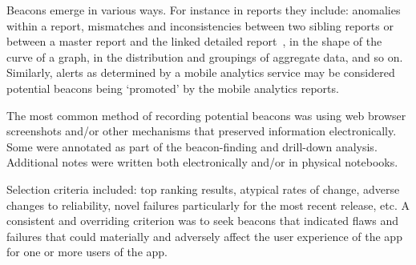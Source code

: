 
Beacons emerge in various ways. For instance in reports they include: anomalies within a report, mismatches and inconsistencies between two sibling reports or between a master report and the linked detailed report~, in the shape of the curve of a graph, in the distribution and groupings of aggregate data, and so on. Similarly, alerts as determined by a mobile analytics service may be considered potential beacons being `promoted' by the mobile analytics reports. 

The most common method of recording potential beacons was using web browser screenshots and/or other mechanisms that preserved information electronically. Some were annotated as part of the beacon-finding and drill-down analysis. Additional notes were written both electronically and/or in physical notebooks. 

Selection criteria included: top ranking results, atypical rates of change, adverse changes to reliability, novel failures particularly for the most recent release, etc. A consistent and overriding criterion was to seek beacons that indicated flaws and failures that could materially and adversely affect the user experience of the app for one or more users of the app.


 


